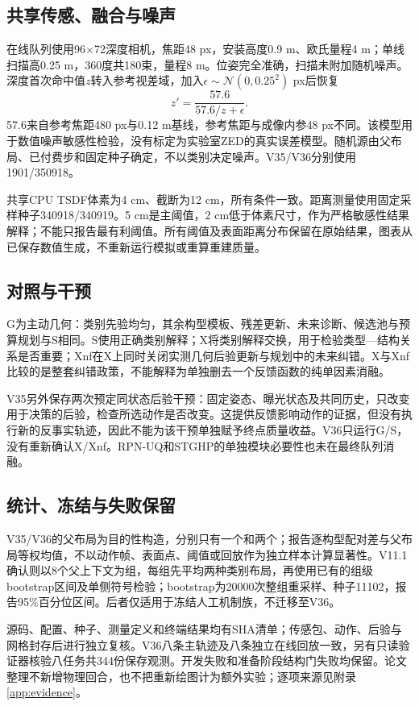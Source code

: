 \documentclass[11pt,a4paper]{article}
\begin{document}
\subsection{共享传感、融合与噪声}
在线队列使用96$\times$72深度相机，焦距48 px，安装高度0.9 m、欧氏量程4 m；单线扫描高0.25 m，360度共180束，量程8 m。位姿完全准确，扫描未附加随机噪声。深度首次命中值$z$转入参考视差域，加入$\epsilon\sim\mathcal N(0,0.25^2)$ px后恢复
\begin{equation}
z'=\frac{57.6}{57.6/z+\epsilon}.
\end{equation}
57.6来自参考焦距480 px与0.12 m基线，参考焦距与成像内参48 px不同。该模型用于数值噪声敏感性检验，没有标定为实验室ZED的真实误差模型。随机源由父布局、已付费步和固定种子确定，不以类别决定噪声。V35/V36分别使用1901/350918。

共享CPU TSDF体素为4 cm、截断为12 cm，所有条件一致。距离测量使用固定采样种子340918/340919。5 cm是主阈值，2 cm低于体素尺寸，作为严格敏感性结果解释；不能只报告最有利阈值。所有阈值及表面距离分布保留在原始结果，图表从已保存数值生成，不重新运行模拟或重算重建质量。

\subsection{对照与干预}
G为主动几何：类别先验均匀，其余构型模板、残差更新、未来诊断、候选池与预算规划与S相同。S使用正确类别解释；X将类别解释交换，用于检验类型—结构关系是否重要；Xnf在X上同时关闭实测几何后验更新与规划中的未来纠错。X与Xnf比较的是整套纠错政策，不能解释为单独删去一个反馈函数的纯单因素消融。

V35另外保存两次预定同状态后验干预：固定姿态、曝光状态及共同历史，只改变用于决策的后验，检查所选动作是否改变。这提供反馈影响动作的证据，但没有执行新的反事实轨迹，因此不能为该干预单独赋予终点质量收益。V36只运行G/S，没有重新确认X/Xnf。RPN-UQ和STGHP的单独模块必要性也未在最终队列消融。

\subsection{统计、冻结与失败保留}
V35/V36的父布局为目的性构造，分别只有一个和两个；报告逐构型配对差与父布局等权均值，不以动作帧、表面点、阈值或回放作为独立样本计算显著性。V11.1确认则以8个父上下文为组，每组先平均两种类别布局，再使用已有的组级bootstrap区间及单侧符号检验；bootstrap为20000次整组重采样、种子11102，报告95\%百分位区间。后者仅适用于冻结人工机制族，不迁移至V36。

源码、配置、种子、测量定义和终端结果均有SHA清单；传感包、动作、后验与网格封存后进行独立复核。V36八条主轨迹及八条独立在线回放一致，另有只读验证器核验八任务共344份保存观测。开发失败和准备阶段结构门失败均保留。论文整理不新增物理回合，也不把重新绘图计为额外实验；逐项来源见附录\ref{app:evidence}。
\end{document}
